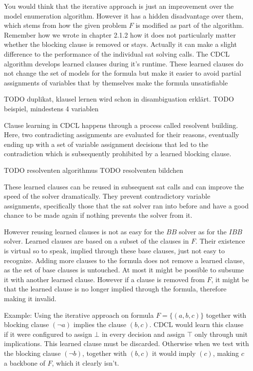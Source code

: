 You would think that the iterative approach is just an improvement over the model enumeration algorithm. However it has a hidden disadvantage over them, which stems from how the given problem $F$ is modified as part of the algorithm. Remember how we wrote in chapter 2.1.2 how it does not particularly matter whether the blocking clause is removed or stays. Actually it can make a slight difference to the performance of the individual sat solving calls. The CDCL algorithm develops learned clauses during it's runtime. These learned clauses do not change the set of models for the formula but make it easier to avoid partial assignments of variables that by themselves make the formula unsatisfiable 

TODO duplikat, klausel lernen wird schon in disambiguation erklärt.
TODO beispiel, mindestens 4 variablen 

Clause learning in CDCL happens through a process called resolvent building. Here, two contradicting assignments are evaluated for their reasons, eventually ending up with a set of variable assignment decisions that led to the contradiction which is subsequently prohibited by a learned blocking clause.

TODO resolventen algorithmus \newline
TODO resolventen bildchen 

These learned clauses can be reused in subsequent sat calls and can improve the speed of the solver dramatically. They prevent contradictory variable assignments, specifically those that the sat solver ran into before and have a good chance to be made again if nothing prevents the solver from it. 

However reusing learned clauses is not as easy for the $BB$ solver as for the $IBB$ solver. Learned clauses are based on a subset of the clauses in $F$. Their existence is virtual so to speak, implied through these base clauses, just not easy to recognize. Adding more clauses to the formula does not remove a learned clause, as the set of base clauses is untouched. At most it might be possible to subsume it with another learned clause. However if a clause is removed from $F$, it might be that the learned clause is no longer implied through the formula, therefore making it invalid. 


Example: Using the iterative approach on formula $F = \{(a,b,c)\}$ together with blocking clause $(\neg a)$ implies the clause $(b,c)$. CDCL would learn this clause if it were configured to assign $\bot$ in every decision and assign $\top$ only through unit implications. This learned clause must be discarded. Otherwise when we test with the blocking clause $(\neg b)$, together with $(b,c)$ it would imply $(c)$, making $c$ a backbone of $F$, which it clearly isn't.


